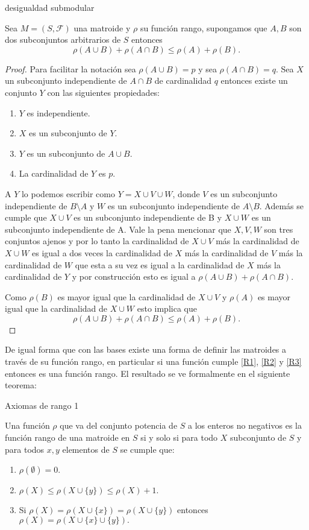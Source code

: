 \begin{cor} {desigualdad submodular} \label {R3'}

Sea $M=(S,\mathcal{F})$ una matroide y $\rho$ su función rango, supongamos que $A,B$ son dos subconjuntos arbitrarios de $S$ entonces
$$\rho(A \cup B)+ \rho(A \cap B) \leq \rho(A) + \rho(B).$$
\end{cor}

\begin{proof}
Para facilitar la notación sea $\rho(A \cup B)=p$ y sea $\rho(A \cap B) =q$. Sea $X$ un subconjunto independiente de $A \cap B$ de cardinalidad $q$ entonces existe un conjunto $Y$ con las siguientes propiedades:
\begin{enumerate}
\item $Y$ es independiente.
\item $X$ es un subconjunto de $Y$.
\item $Y$ es un subconjunto de $A \cup B$.
\item La cardinalidad de $Y$ es $p$.
\end{enumerate}
A $Y$ lo podemos escribir como $Y=X \cup V \cup W$, donde $V$ es un subconjunto independiente de $B \setminus A$ y $W$ es un subconjunto independiente de $A \setminus B$. Además se cumple que $X \cup V$ es un subconjunto independiente de B y $X \cup W$ es un subconjunto independiente de A. Vale la pena mencionar que $X, V,W$ son tres conjuntos ajenos y por lo tanto la cardinalidad de $X \cup V$ más la cardinalidad de $X \cup W$ es igual a dos veces la cardinalidad de $X$ más la cardinalidad de $V$ más la cardinalidad de $W$ que esta a su vez es igual a la cardinalidad de $X$ más la cardinalidad de $Y$ y por construcción esto es igual a $\rho(A \cup B)+ \rho(A \cap B)$. 

Como $\rho(B)$ es mayor igual que la cardinalidad de $X \cup V$ y $\rho(A)$ es mayor igual que la cardinalidad de $X \cup W$ esto implica que 
$$\rho(A \cup B)+ \rho(A \cap B) \leq \rho(A) + \rho(B).$$
\end{proof}

De igual forma que con las bases existe una forma de definir las matroides a través de su función rango, en particular si una función cumple \ref{R1}, \ref{R2} y \ref{R3} entonces es una función rango. El resultado se ve formalmente en el siguiente teorema:

\begin{teo}{Axiomas de rango 1} \label{rank 1}

Una función $\rho$ que va del conjunto potencia de $S$ a los enteros no negativos es la función rango de una matroide en $S$ si y solo si para todo $X$ subconjunto de $S$ y para todos $x,y$ elementos de $S$ se cumple que:
\begin{enumerate}
\item $\rho(\emptyset) =0.$
\item $\rho(X) \leq \rho(X \cup \{y\}) \leq \rho(X)+1.$
\item Si $\rho(X)=\rho(X \cup \{ x\}) =\rho(X \cup \{ y\}) $ entonces $\rho(X)=\rho(X \cup \{ x\} \cup \{ y\}).$
\end{enumerate}
\end{teo}

